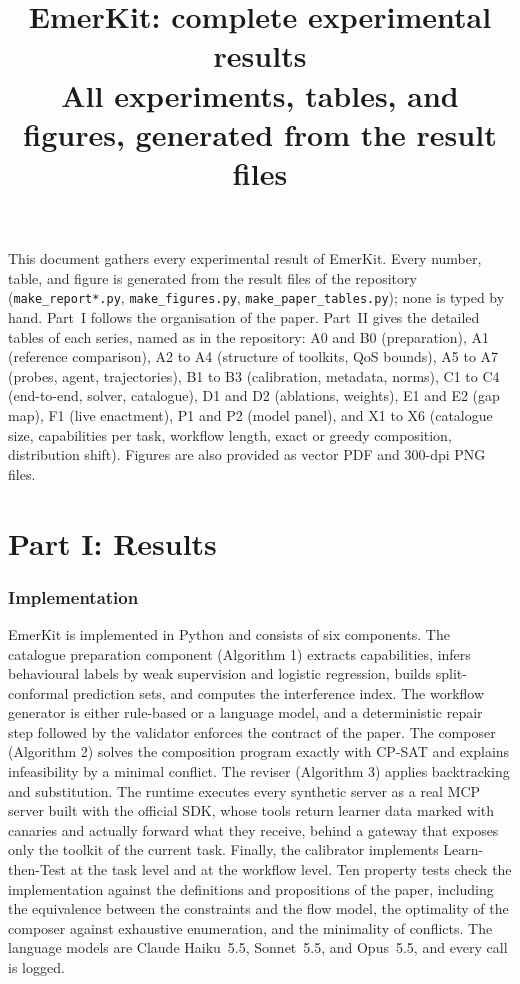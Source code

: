 \documentclass[10pt]{article}
\title{EmerKit: complete experimental results\\\large All experiments, tables, and figures, generated from the result files}
\date{}
\newcommand{\sysname}{EmerKit}
\begin{document}
\maketitle
\noindent This document gathers every experimental result of EmerKit. Every number, table, and figure is generated from the result files of the repository (\texttt{make\_report*.py}, \texttt{make\_figures.py}, \texttt{make\_paper\_tables.py}); none is typed by hand. Part~I follows the organisation of the paper. Part~II gives the detailed tables of each series, named as in the repository: A0 and B0 (preparation), A1 (reference comparison), A2 to A4 (structure of toolkits, QoS bounds), A5 to A7 (probes, agent, trajectories), B1 to B3 (calibration, metadata, norms), C1 to C4 (end-to-end, solver, catalogue), D1 and D2 (ablations, weights), E1 and E2 (gap map), F1 (live enactment), P1 and P2 (model panel), and X1 to X6 (catalogue size, capabilities per task, workflow length, exact or greedy composition, distribution shift). Figures are also provided as vector PDF and 300-dpi PNG files.

\part*{Part I: Results}
\section{Implementation}\label{sec:impl}

\sysname{} is implemented in Python and consists of six components. The catalogue preparation component (Algorithm 1) extracts capabilities, infers behavioural labels by weak supervision and logistic regression, builds split-conformal prediction sets, and computes the interference index. The workflow generator is either rule-based or a language model, and a deterministic repair step followed by the validator enforces the contract of the paper. The composer (Algorithm 2) solves the composition program exactly with CP-SAT and explains infeasibility by a minimal conflict. The reviser (Algorithm 3) applies backtracking and substitution. The runtime executes every synthetic server as a real MCP server built with the official SDK, whose tools return learner data marked with canaries and actually forward what they receive, behind a gateway that exposes only the toolkit of the current task. Finally, the calibrator implements Learn-then-Test at the task level and at the workflow level. Ten property tests check the implementation against the definitions and propositions of the paper, including the equivalence between the constraints and the flow model, the optimality of the composer against exhaustive enumeration, and the minimality of conflicts. The language models are Claude Haiku~5.5, Sonnet~5.5, and Opus~5.5, and every call is logged.
\end{document}
